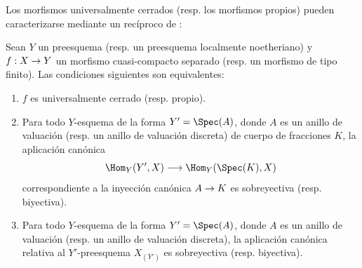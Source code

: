 \documentclass[oneside,10pt]{amsart}
\makeatletter
\newcommand{\ega@arrow}[2]{\mathchoice{#1}{#2}{#2}{#2}}
\renewcommand{\to}{\ega@arrow{\longrightarrow}{\rightarrow}}
\newcommand{\oldpage}[2][]{\marginnote{\normalfont\footnotesize\textbf{#1}~|~#2}\ignorespaces}
\let\EGAOriginalLabel\label
\renewcommand{\label}[1]{\phantomsection\EGAOriginalLabel{#1}}
\makeatother
\begin{document}

Los morfismos universalmente cerrados (resp. los morfismos propios) pueden caracterizarse mediante un recíproco de :

\begin{theorem}[7.3.8]
\label{II.7.3.8}
Sean $Y$ un preesquema \textup{(resp.} un preesquema localmente noetheriano\textup{)} y $f:X\to Y$ un morfismo cuasi-compacto separado \textup{(resp.} un morfismo de tipo finito\textup{)}.
Las condiciones siguientes son equivalentes:
\begin{enumerate}
  \item[\rm{(a)}] $f$ es universalmente cerrado \textup{(resp.} propio\textup{)}.
  \item[\rm{(b)}] Para todo $Y$-esquema de la forma $Y'=\Spec(A)$, donde $A$ es un anillo de valuación \textup{(resp.} un anillo de valuación discreta) de cuerpo de fracciones $K$, la aplicación canónica
  \[
    \Hom_Y(Y',X)\longrightarrow\Hom_Y(\Spec(K),X)
  \]
  correspondiente a la inyección canónica $A\to K$ es sobreyectiva \textup{(resp.} biyectiva\textup{)}.
\oldpage[II]{145}
  \item[\rm{(c)}] Para todo $Y$-esquema de la forma $Y'=\Spec(A)$, donde $A$ es un anillo de valuación \textup{(resp.} un anillo de valuación discreta), la aplicación canónica  relativa al $Y'$-preesquema $X_{(Y')}$ es sobreyectiva \textup{(resp.} biyectiva).
\end{enumerate}
\end{theorem}
\end{document}
